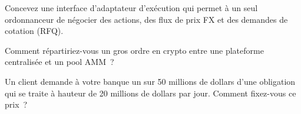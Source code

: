 \begin{interviewq}\label{iq:mx:execution-beyond-equities:4}
Concevez une interface d'adaptateur d'exécution qui permet à un seul ordonnanceur de négocier des actions, des flux de prix FX et des demandes de cotation (RFQ).
\end{interviewq}

\begin{interviewq}\label{iq:mx:execution-beyond-equities:5}
Comment répartiriez-vous un gros ordre en crypto entre une plateforme centralisée et un pool AMM~?
\end{interviewq}

\begin{interviewq}\label{iq:mx:execution-beyond-equities:6}
Un client demande à votre banque un  sur 50 millions de dollars d'une obligation qui se traite à hauteur de 20 millions de dollars par jour. Comment fixez-vous ce prix~?
\end{interviewq}
